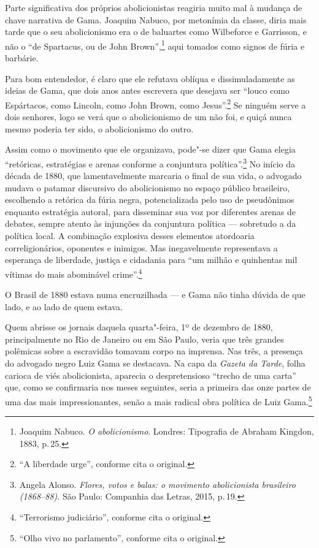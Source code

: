 \begin{multicols}{2}
Parte significativa dos próprios abolicionistas reagiria muito mal à mudança de chave narrativa de Gama. Joaquim Nabuco, por metonímia da classe, diria mais tarde que o seu abolicionismo era o de baluartes como Wilbeforce e Garrisson, e não o “de Spartacus, ou de John Brown”,\footnote{Joaquim Nabuco. \textit{O abolicionismo}. Londres: Tipografia de Abraham Kingdon, 1883, p.\,25.} aqui tomados como signos de fúria e barbárie.

Para bom entendedor, é claro que ele refutava oblíqua e dissimuladamente as ideias de Gama, que dois anos antes escrevera que desejava ser ``louco como Espártacos, como Lincoln, como John Brown, como Jesus''.\footnote{``A liberdade urge'', conforme cita o original.} Se ninguém serve a dois senhores, logo se verá que o abolicionismo de um não foi, e quiçá nunca mesmo poderia ter sido, o abolicionismo do outro.

Assim como o movimento que ele organizava, pode"-se dizer que Gama elegia ``retóricas, estratégias e arenas conforme a conjuntura política''.\footnote{Angela Alonso. \textit{Flores, votos e balas: o movimento abolicionista brasileiro (1868--88)}. São Paulo: Companhia das Letras, 2015, p.\,19.} No início da década de 1880, que lamentavelmente marcaria o final de sua vida, o advogado  mudava o patamar discursivo do abolicionismo no espaço público brasileiro, escolhendo a retórica da fúria negra, potencializada pelo uso de pseudônimos enquanto estratégia autoral, para disseminar sua voz por diferentes arenas de debates, sempre atento às injunções da conjuntura política --- sobretudo a da política local. A combinação explosiva desses elementos atordoaria correligionários, oponentes e inimigos. Mas inegavelmente representava a esperança de liberdade, justiça e cidadania para ``um milhão e quinhentas mil vítimas do mais abominável crime''.\footnote{``Terrorismo judiciário'', conforme cita o original.}

O Brasil de 1880 estava numa encruzilhada --- e Gama não tinha dúvida de que lado, e ao lado de quem estava.

Quem abrisse os jornais daquela quarta"-feira, 1º de dezembro de 1880, principalmente no Rio de Janeiro ou em São Paulo, veria que três grandes polêmicas sobre a escravidão tomavam corpo na imprensa. Nas três, a presença do advogado negro Luiz Gama se destacava. Na capa da \textit{Gazeta da Tarde}, folha carioca de viés abolicionista, aparecia o despretensioso ``trecho de uma carta'' que, como se confirmaria nos meses seguintes, seria a primeira das onze partes de uma das mais impressionantes, senão a mais radical obra política de Luiz Gama.\footnote{``Olho vivo no parlamento'', conforme cita o original.} 


\end{multicols}
